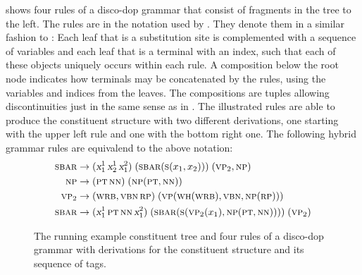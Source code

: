 \documentclass[../../document.tex]{subfiles}
\begin{document}
    \begin{example}\label{ex:dop}
         shows four rules of a disco-dop grammar that consist of fragments in the tree to the left.
        The rules are in the notation used by \citet{CraSchBod16}.
        They denote them in a similar fashion to :
            Each leaf that is a substitution site is complemented with a sequence of variables and each leaf that is a terminal with an index, such that each of these objects uniquely occurs within each rule.
            A composition below the root node indicates how terminals may be concatenated by the rules, using the variables and indices from the leaves.
            The compositions are tuples allowing discontinuities just in the same sense as in .
        The illustrated rules are able to produce the constituent structure with two different derivations, one starting with the upper left rule and one with the bottom right one.
        The following hybrid grammar rules are equivalend to the above notation: \begin{align*}
            \textsc{sbar} &\to (\textsl{x}_1^1 \, \textsl{x}_2^1 \, \textsl{x}_1^2)\;(\textsc{sbar} (\textsc{s} (x_1, x_2)))\;(\textsc{vp}_2, \textsc{np}) \\
            \textsc{np} &\to (\textsc{pt} \, \textsc{nn})\;(\textsc{np} (\textsc{pt}, \textsc{nn})) \\
            \textsc{vp}_2 &\to (\textsc{wrb}, \textsc{vbn} \, \textsc{rp})\;(\textsc{vp} (\textsc{wh}(\textsc{wrb}),\textsc{vbn},\textsc{np}(\textsc{rp}))) \\
            \textsc{sbar} &\to (\textsl{x}_1^1 \, \textsc{pt} \, \textsc{nn} \, \textsl{x}_1^2)\;(\textsc{sbar} (\textsc{s} (\textsc{vp}_2(x_1),\textsc{np}(\textsc{pt}, \textsc{nn}))))\;(\textsc{vp}_2)
        \end{align*}
    \end{example}
    
    \begin{figure}
        \null\hfill
        
        \hspace{1cm}
        
        \hfill\null
        \caption{\label{fig:ex:dop}
            The running example constituent tree and four rules of a disco-dop grammar with derivations for the constituent structure and its sequence of  tags.}
    \end{figure}
\end{document}
